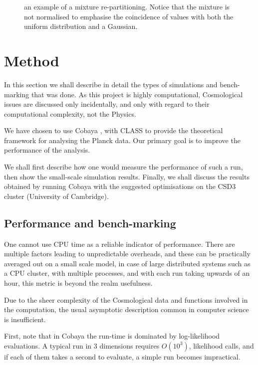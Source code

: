 \documentclass[usenatbib]{mnras}
\begin{document}
\begin{figure}
 
\caption{\label{org593cc82}
an example of a mixture re-partitioning. Notice that the mixture is not normalised to emphasise the coincidence of values with both the uniform distribution and a Gaussian.}
\end{figure}



\section{Method}
\label{sec:org4c21c29}
In this section we shall describe in detail the types of simulations
and bench-marking that was done. As this project is highly
computational, Cosmological issues are discussed only incidentally,
and only with regard to their computational complexity, not the
Physics.

We have chosen to use Cobaya \citep{cobaya}, with CLASS to provide the
theoretical framework for analysing the Planck \citep{planck}
data. Our primary goal is to improve the performance of the
analysis.

We shall first describe how one would measure the performance of
such a run, then show the small-scale simulation results. Finally,
we shall discuss the results obtained by running Cobaya with the
suggested optimisations on the CSD3 cluster (University of Cambridge).


\subsection{Performance and bench-marking}
\label{sec:org64bba71}
One cannot use CPU time as a reliable indicator of
performance. There are multiple factors leading to unpredictable
overheads, and these can be practically averaged out on a small
scale model, in case of large distributed systems such as a CPU
cluster, with multiple processes, and with each run taking upwards
of an hour, this metric is beyond the realm usefulness.

Due to the sheer complexity of the Cosmological data and functions
involved in the computation, the usual asymptotic description
common in computer science is insufficient. 

First, note that in Cobaya  the run-time is dominated
by log-likelihood evaluations. A typical run in 3 dimensions
requires \(O(10^{3})\), likelihood calls, and if each of them takes a
second to evaluate, a simple run becomes impractical. 
\end{document}
